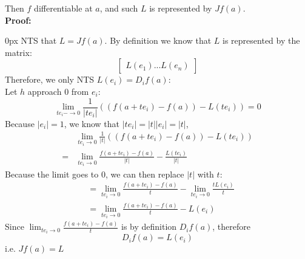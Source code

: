 \documentclass{article}
\begin{document}
Then $f$ differentiable at $a$, and such $L$ is represented by $Jf(a)$.\\
\textbf{Proof:}
\begin{addmargin}[10px]{0px}
    NTS that $L = Jf(a)$. By definition we know that $L$ is represented by the matrix:
    \begin{equation*}
        \begin{bmatrix}
            L(e_1) ... L(e_n)
        \end{bmatrix}
    \end{equation*}
    Therefore, we only NTS $L(e_i) = D_if(a)$:\\
    Let $h$ approach $0$ from $e_i$:
    \begin{equation*}
        \lim_{te_i -\rightarrow 0} \frac{1}{|te_i|}
        ((f(a+te_i)-f(a)) - L(te_i)) = 0
    \end{equation*}
    Because $|e_i| = 1$, we know that $|te_i| = |t||e_i| = |t|$,
    \begin{equation*}
        \begin{split}
            &\lim_{te_i\rightarrow 0}\frac{1}{|t|}((f(a+te_i) - f(a)) - L(te_i))\\
            =& \lim_{te_i\rightarrow 0}\frac{f(a+te_i) - f(a)}{|t|} - \frac{L(te_i)}{|t|}
        \end{split}
    \end{equation*}
    Because the limit goes to $0$, we can then replace $|t|$ with $t$:
    \begin{equation*}
        \begin{split}
            &=\lim_{te_i\rightarrow 0}\frac{f(a+te_i)-f(a)}{t} - \lim_{te_i\rightarrow 0}\frac{tL(e_i)}{t}\\
            &=\lim_{te_i\rightarrow 0}\frac{f(a+te_i)-f(a)}{t} - L(e_i)
        \end{split}
    \end{equation*}
    Since $\lim_{te_i\rightarrow 0}\frac{f(a+te_i)-f(a)}{t}$ is by definition $D_if(a)$, therefore
    \begin{equation*}
        D_if(a) = L(e_i)
    \end{equation*}
    i.e. $Jf(a) = L$
\end{addmargin}
\end{document}
